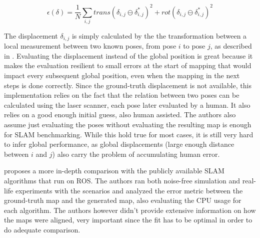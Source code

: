 \begin{equation}\label{eq:displacement}
    \epsilon(\delta) = \frac{1}{N} \sum_{i, j} trans(\delta_{i,j} \ominus \delta_{i,j}^*)^2 + rot(\delta_{i,j} \ominus \delta_{i,j}^*)^2
\end{equation}

 The displacement $\delta_{i, j}$ is simply calculated by the the transformation between a local measurement between two known poses, from pose $i$ to pose $j$, as described in . Evaluating the displacement instead of the global position is great because it makes the evaluation resilient to small errors at the start of mapping that would impact every subsequent global position, even when the mapping in the next steps is done correctly. Since the ground-truth displacement is not available, this implementation relies on the fact that the relation between two poses can be calculated using the laser scanner, each pose later evaluated by a human. It also relies on a good enough initial guess, also human assisted. The authors also assume just evaluating the poses without evaluating the resulting map is enough for SLAM benchmarking. While this hold true for most cases, it is still very hard to infer global performance, as global displacements (large enough distance between $i$ and $j$) also carry the problem of accumulating human error.
 
 \citeauthor{santos2013evaluation} proposes a more in-depth comparison with the publicly available SLAM algorithms that run on ROS. The authors ran both noise-free simulation and real-life experiments with the scenarios and analyzed the error metric between the ground-truth map and the generated map, also evaluating the CPU usage for each algorithm. The authors however didn't provide extensive information on how the maps were aligned, very important since the fit has to be optimal in order to do adequate comparison.